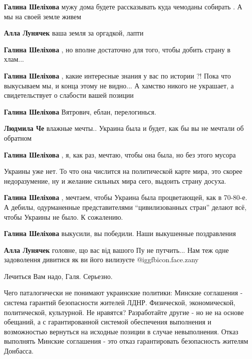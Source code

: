\begin{itemize}
\begin{itemize}
\textbf{Галина Шеліхова} мужу дома будете рассказывать куда чемоданы собирать . А мы на своей земле живем

\textbf{Алла Лунячек} ваша земля за оргадкой, лапти

\textbf{Галина Шеліхова} , но вполне достаточно для того, чтобы добить страну в хлам...

\textbf{Галина Шеліхова} , какие интересные знания у вас по истории ?! Пока что выкусываем мы, и конца этому не видно... А хамство никого не украшает, а свидетельствует о слабости вашей позиции

\textbf{Галина Шеліхова} Вятрович, еблан, перелогинься.

\textbf{Людмила Че} влажные мечты.. Украина была и будет, как бы вы не мечтали об обратном

\textbf{Галина Шеліхова} , я, как раз, мечтаю, чтобы она была, но без этого мусора

Украины уже нет. То что она числится на политической карте мира, это скорее
недоразумение, ну и желание сильных мира сего, выдоить страну досуха.

\textbf{Галина Шеліхова} , мечтаем, чтобы Украина была процветающей, как в 70-80-е.
А дебилы, одурманенные представителями \enquote{цивилизованных стран} делают всё, чтобы Украины не было. К сожалению.

\textbf{Галина Шеліхова} выкусили, вы победили. Наши выкушенные поздравления

\textbf{Алла Лунячек} головне, що вас від вашого Пу не путчить... Нам теж одне
задоволення дивитися як ви його вилизуєте  @igg{fbicon.face.zany} 

Лечиться Вам надо, Галя. Серьезно.
\end{itemize} %


Чего паталогически не понимают украинские политики: Минские соглашения -
система гарантий безопасности жителей ЛДНР. Физической, экономической,
политической, культурной. Не нравятся? Разработайте другие - но не на основе
обещаний, а с гарантированной системой обеспечения выполнения и возможностью
вернуться на исходные позиции в случае невыполнения. Отказ выполнять Минские
соглашения - это отказ гарантировать безопасность жителям Донбасса.


\end{itemize}
